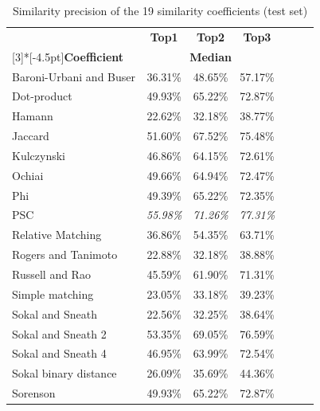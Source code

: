 \documentclass[smallextended,natbib]{svjour3}
\begin{document}
{\begin{table}[tbp]
  \centering
  \caption{Similarity precision of the 19 similarity coefficients (test set)}
  \vspace{-8pt}
  \footnotesize
    \begin{tabular}{lcccccc}
    \hline
    \rowcolor{gray!50}\multicolumn{4}{c}{\textbf{MOVE CLASS}} \\
    \hline
    \rowcolor{gray!25} & \multicolumn{1}{c}{\textbf{Top1}} & \multicolumn{1}{c}{\textbf{Top2}} & \textbf{Top3} \\
    \rowcolor{gray!25} \multirow{-2}[3]{*}[-4.5pt]{\textbf{Coefficient}} & \multicolumn{3}{c}{\textbf{Median}} \\
    Baroni-Urbani and Buser & 36.31\% & 48.65\% & 57.17\% \\[-0.0110cm]
    \rowcolor{gray!15}Dot-product & 49.93\% & 65.22\% & 72.87\% \\[-0.0110cm]
    Hamann & 22.62\% & 32.18\% & 38.77\% \\[-0.0110cm]
    \rowcolor{gray!15}Jaccard & 51.60\% & 67.52\% & 75.48\% \\[-0.0110cm]
    Kulczynski & 46.86\% & 64.15\% & 72.61\% \\[-0.0110cm]
    \rowcolor{gray!15}Ochiai & 49.66\% & 64.94\% & 72.47\% \\[-0.0110cm]
    Phi & 49.39\% & 65.22\% & 72.35\% \\[-0.0110cm]
    \rowcolor{gray!15}PSC & \textit{55.98\%} & \textit{71.26\%} & \textit{77.31\%} \\[-0.0110cm]
    Relative Matching & 36.86\% & 54.35\% & 63.71\% \\[-0.0110cm]
    \rowcolor{gray!15}Rogers and Tanimoto & 22.88\% & 32.18\% & 38.88\% \\[-0.0110cm]
    Russell and Rao & 45.59\% & 61.90\% & 71.31\% \\[-0.0110cm]
    \rowcolor{gray!15}Simple matching & 23.05\% & 33.18\% & 39.23\% \\[-0.0110cm]
    Sokal and Sneath & 22.56\% & 32.25\% & 38.64\% \\[-0.0110cm]
    \rowcolor{gray!15}Sokal and Sneath 2 & 53.35\% & 69.05\% & 76.59\% \\[-0.0110cm]
    Sokal and Sneath 4 & 46.95\% & 63.99\% & 72.54\% \\[-0.0110cm]
    \rowcolor{gray!15}Sokal binary distance & 26.09\% & 35.69\% & 44.36\% \\[-0.0110cm]
    Sorenson & 49.93\% & 65.22\% & 72.87\% \\[-0.0110cm]

\end{tabular}
\end{table}}
\end{document}

